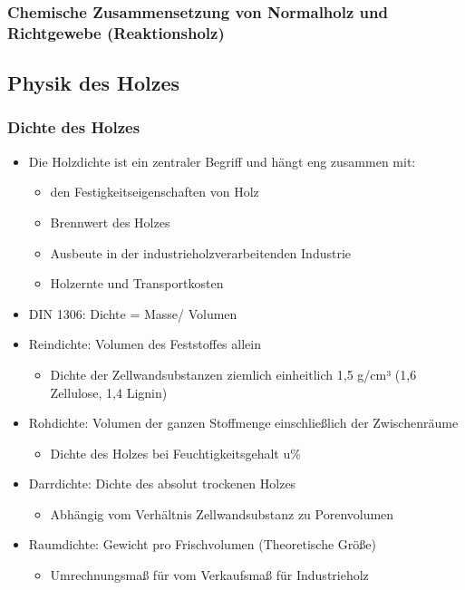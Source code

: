 \documentclass[12pt]{article}
\begin{document}
\subsubsection{Chemische Zusammensetzung von Normalholz und Richtgewebe
(Reaktionsholz)}

\subsection{Physik des Holzes}
\subsubsection{Dichte des Holzes}
\begin{itemize}
  \item Die Holzdichte ist ein zentraler Begriff und hängt eng  zusammen mit:
  \begin{itemize}
    \item den Festigkeitseigenschaften von Holz 
    \item Brennwert des Holzes
    \item Ausbeute in der industrieholzverarbeitenden Industrie
    \item Holzernte und Transportkosten
  \end{itemize}
  \item DIN 1306: Dichte = Masse/ Volumen
  \item Reindichte: Volumen des Feststoffes allein
  \begin{itemize}
    \item Dichte der Zellwandsubstanzen ziemlich einheitlich 1,5 g/cm³ (1,6
    Zellulose, 1,4 Lignin)
  \end{itemize}
  \item Rohdichte: Volumen der ganzen Stoffmenge einschließlich der
  Zwischenräume
  \begin{itemize}
    \item Dichte des Holzes bei Feuchtigkeitsgehalt u\%
  \end{itemize}
  \item Darrdichte: Dichte des absolut trockenen Holzes
  \begin{itemize}
    \item Abhängig vom Verhältnis Zellwandsubstanz zu Porenvolumen
  \end{itemize}
  \item Raumdichte: Gewicht pro Frischvolumen (Theoretische Größe)
  \begin{itemize}
    \item Umrechnungsmaß für vom Verkaufsmaß für Industrieholz
    \end{itemize}
  \end{itemize}
 
\end{document}

